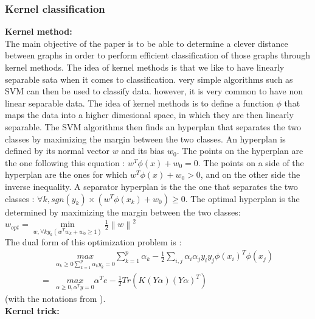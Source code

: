 \documentclass[a4paper,11pt]{article}
\begin{document}
\subsubsection{Kernel classification}

\textbf{Kernel method: } \\

The main objective of the paper is to be able to determine a clever distance between graphs in order to perform efficient classification of those graphs through kernel methods. 
The idea of kernel methods is that we like to have linearly separable sata when it comes to classification. 
very simple algorithms such as SVM can then be used to classify data. 
however, it is very common to have non linear separable data. 
The idea of kernel methods is to define a function $\phi$ that maps the data into a higher dimesional space, in which they are then linearly separable. 
The SVM algorithms then finds an hyperplan that separates the two classes by maximizing the margin between the two classes.
An hyperplan is defined by its normal vector $w$ and its bias $w_0$.
The points on the hyperplan are the one following this equation : $w^T \phi(x) + w_0 = 0$.
The points on a side of the hyperplan are the ones for which $w^T \phi(x) + w_0 > 0$, and on the other side the inverse inequality. 
A separator hyperplan is the the one that separates the two classes : $\forall k, sgn(y_k) \times (w^T\phi(x_k)+w_0) \geq 0 $. 
The optimal hyperplan is the determined by maximizing the margin between the two classes:  \\

$w_{opt} =  \underset{w, \forall k y_k(w^Tw_k+w_0 \geq 1)}{\operatorname{min}}  \frac{1}{2} \left\lVert w\right\rVert^2 $\\[0.2cm]

The dual form of this optimization problem is : \\

\begin{align}
     & \underset{\alpha_k \geq 0 \sum_{k=1}^{p} \alpha_k y_k = 0 }{ max }   \sum_{k=1}^{p} \alpha_k -\frac{1}{2}  \sum_{i,j} \alpha_i \alpha_j y_i y_j \phi(x_i)^T \phi(x_j) \\
    = & \underset{\alpha \geq 0, \alpha^T y = 0 }{max}  \alpha^T e - \frac{1}{2}Tr(K(Y\alpha)(Y \alpha)^T) 
\end{align}
(with the notations from \cite{lanckriet2004learning}).\\[1cm]

\textbf{Kernel trick: } \\
\end{document}
